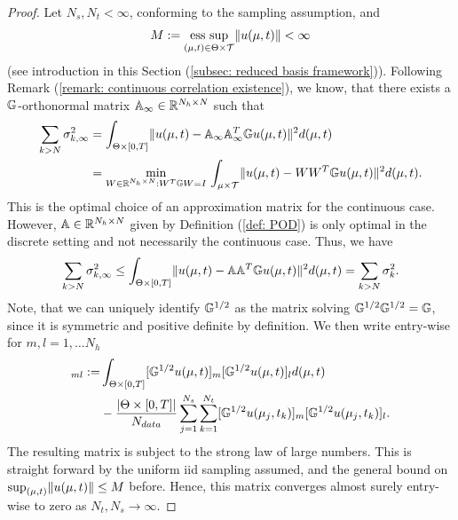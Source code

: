 \begin{proof}
    Let $N_s, N_t < \infty$, conforming to the sampling assumption, and 
    \begin{equation*}
        M := 
        \underset{(\mu, t) \in \Theta \times \mathcal{T}}{\operatorname{ess}\, \sup}
        \lVert u(\mu, t) \rVert < \infty
    \end{equation*} 
    (see introduction in this Section 
    (\ref{subsec: reduced basis framework})).
    Following Remark (\ref{remark: continuous correlation existence}), we know, that 
    there exists a $\mathbb{G}$-orthonormal matrix $\mathbb{A}_\infty \in \mathbb{R}^{N_h \times N}$ such that 
    \begin{align*}
        \sum_{k > N} \sigma^2_{k, \infty} &= \int_{\Theta \times [0, T]} \lVert u(\mu, t) - \mathbb{A}_\infty \mathbb{A}^T_\infty \mathbb{G} u(\mu, t) \rVert^2 d(\mu, t) \\
        &= \underset{W \in \mathbb{R}^{N_h \times N}: W^T \mathbb{G} W = I}{\min} \, \int_{\mu \times \mathcal{T}} \lVert u(\mu, t) - W W^T \mathbb{G} u(\mu, t)  \rVert^2 d(\mu, t).
    \end{align*}
    This is the optimal choice of an approximation matrix for the continuous case. However,
    $\mathbb{A} \in \mathbb{R}^{N_h \times N}$ given by Definition (\ref{def: POD}) is only optimal in the discrete setting and 
    not necessarily the continuous case. Thus, we have
    \begin{equation*}
        \sum_{k > N} \sigma^2_{k, \infty} \leq \int_{\Theta \times [0, T]} 
        \lVert u(\mu, t) - \mathbb{A} \mathbb{A}^T \mathbb{G} u(\mu, t) \rVert^2 d(\mu, t) = \sum_{k > N} \sigma^2_k.
    \end{equation*} 
    Note, that we can uniquely identify $\mathbb{G}^{1/2}$ as the matrix solving $\mathbb{G}^{1/2} \mathbb{G}^{1/2} = \mathbb{G}$, since
    it is symmetric and positive definite by definition. 
    We then write entry-wise for $m, l = 1, \dots N_h$
    \begin{align*}
        [K_\infty - K]_{ml} :=& \int_{\Theta \times [0, T]} [\G^{1/2}u(\mu, t)]_m [\G^{1/2}u(\mu, t)]_l d(\mu, t) \\
        &- \frac{\vert \Theta \times [0, T] \vert}{N_{data}} \sum_{j=1}^{N_s} 
        \sum_{k=1}^{N_t} [\G^{1/2}u(\mu_j, t_k)]_m [\G^{1/2}u(\mu_j, t_k)]_l.
    \end{align*}
    The resulting matrix is subject to the strong law of large numbers.
    This is straight forward
    by the uniform iid sampling assumed, and the general bound on $\sup_{(\mu, t)} \lVert u(\mu, t) \rVert \leq M$ before.
    Hence, this matrix converges almost surely entry-wise to zero as 
    $N_t, N_s \to \infty$.
    

\end{proof}

